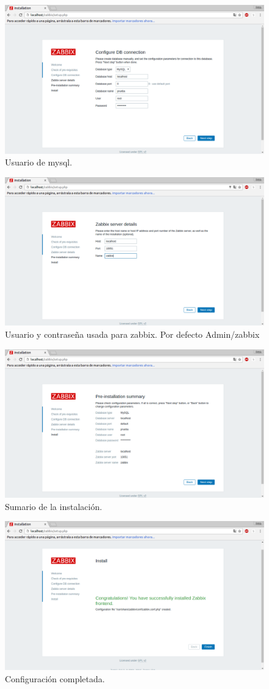 \begin{itemize}
	\begin{figure}[H]
	\centering
	\includegraphics[width=0.7\linewidth]{zabbix3}
	\caption[zabbix3]{Usuario de mysql.}
	\label{fig:zabbix3}
	\end{figure}
	
	\begin{figure}[H]
	\centering
	\includegraphics[width=0.7\linewidth]{zabbix4}
	\caption[zabbix4]{Usuario y contraseña usada para zabbix. Por defecto Admin/zabbix}
	\label{fig:zabbix4}
	\end{figure}
	
	\begin{figure}[H]
	\centering
	\includegraphics[width=0.7\linewidth]{zabbix5}
	\caption[zabbix5]{Sumario de la instalación.}
	\label{fig:zabbix5}
	\end{figure}
	
	\begin{figure}[H]
	\centering
	\includegraphics[width=0.7\linewidth]{zabbix6}
	\caption[zabbix6]{Configuración completada.}
	\label{fig:zabbix6}
	\end{figure}
	

\end{itemize}

